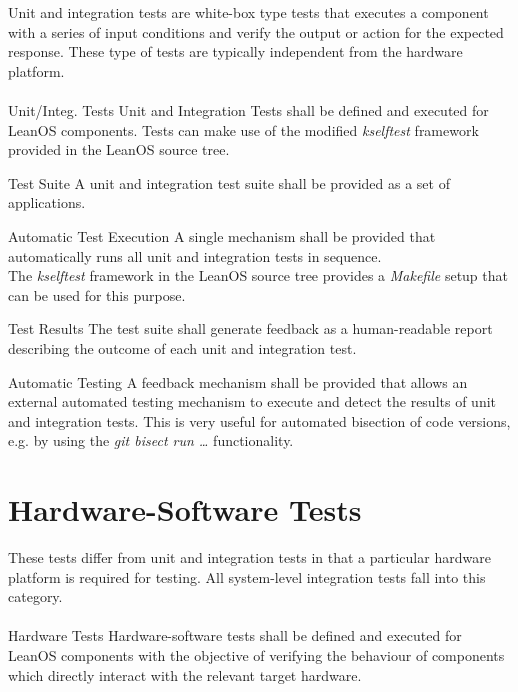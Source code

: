 \noindent
Unit and integration tests are white-box type tests that executes a component
with a series of input conditions and verify the output or action for the
expected response. These type of tests are typically independent from the
hardware platform.\\
\\

 {Unit/Integ. Tests}{%
Unit and Integration Tests shall be defined and executed for LeanOS components.
}{Tests can make use of the modified \emph{kselftest} framework provided %
in the LeanOS source tree.
}%

 {Test Suite}{%
A unit and integration test suite shall be provided as a set of applications.
}{}%

 {Automatic Test Execution}{%
A single mechanism shall be provided that automatically runs all unit and %
integration tests in sequence.\\
}{
The \emph{kselftest} framework in the LeanOS source tree provides a %
\emph{Makefile} setup that can be used for this purpose.}%

 {Test Results}{%
The test suite shall generate feedback as a human-readable report describing the %
outcome of each unit and integration test.%
}{}

 {Automatic Testing}{%
A feedback mechanism shall be provided that allows an external automated %
testing mechanism to execute and detect the results of unit and integration %
tests.%
}{This is very useful for automated bisection of code versions, e.g. by %
using the \emph{git bisect run \ldots} functionality.}%


\section {Hardware-Software Tests}

These tests differ from unit and integration tests in that a particular hardware
platform is required for testing. All system-level integration tests fall into
this category.\\
\\

 {Hardware Tests}{%
Hardware-software tests shall be defined and executed for LeanOS components %
with the objective of verifying the behaviour of components which directly %
interact with the relevant target hardware.%
}{}


